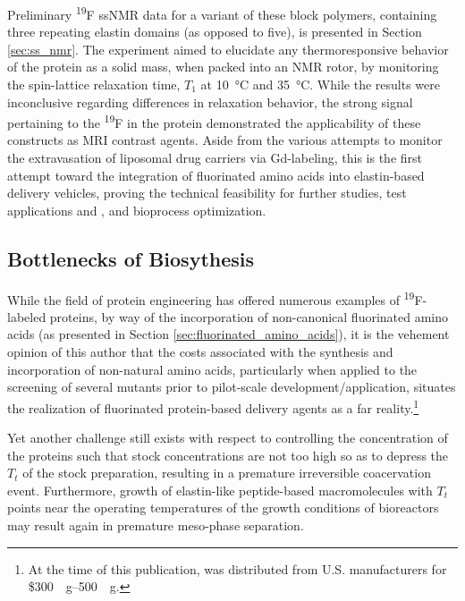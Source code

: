 \begin{refsection}
Preliminary \textsuperscript{19}F ssNMR data for a variant of these block
polymers, containing three repeating elastin domains (as opposed to five), is
presented in Section \ref{sec:ss_nmr}. The experiment aimed to elucidate any
thermoresponsive behavior of the protein as a solid mass, when packed into an
NMR rotor, by monitoring the spin-lattice relaxation time, ${T_{1}}$ at
\SI{10}{\celsius} and \SI{35}{\celsius}. While the results were inconclusive
regarding differences in relaxation behavior, the strong signal pertaining to the
\textsuperscript{19}F in the protein demonstrated the applicability of these
constructs as MRI contrast agents. Aside from the various attempts to monitor the
extravasation of liposomal drug carriers via Gd-labeling,\cite{Tagami2011} this
is the first attempt toward the integration of fluorinated amino acids into
elastin-based delivery vehicles, proving the technical feasibility for further
studies, test applications  and , and bioprocess
optimization.

\subsection{Bottlenecks of Biosythesis}

While the field of protein engineering has offered numerous examples of
\textsuperscript{19}F-labeled proteins, by way of the incorporation of
non-canonical fluorinated amino acids (as presented in Section
\ref{sec:fluorinated_amino_acids}), it is the vehement opinion of this author
that the costs associated with the synthesis and incorporation of non-natural
amino acids,\cite{Hodgson2004,Ojima1989} particularly when applied to the
screening of several mutants prior to pilot-scale development/application, 
situates the realization of fluorinated protein-based delivery agents as a far
reality.\footnote{At the time of this publication,  was
distributed from U.S. manufacturers for
\$\SIrange[range-phrase=--]{300}{500}{\per\gram}.}

Yet another challenge still exists with respect to controlling the concentration
of the proteins such that stock concentrations are not too high so as to depress
the ${T_t}$ of the stock preparation, resulting in a premature irreversible
coacervation event. Furthermore, growth of elastin-like peptide-based
macromolecules with ${T_t}$ points near the operating temperatures of the growth
conditions of bioreactors may result again in premature meso-phase separation.


\end{refsection}
